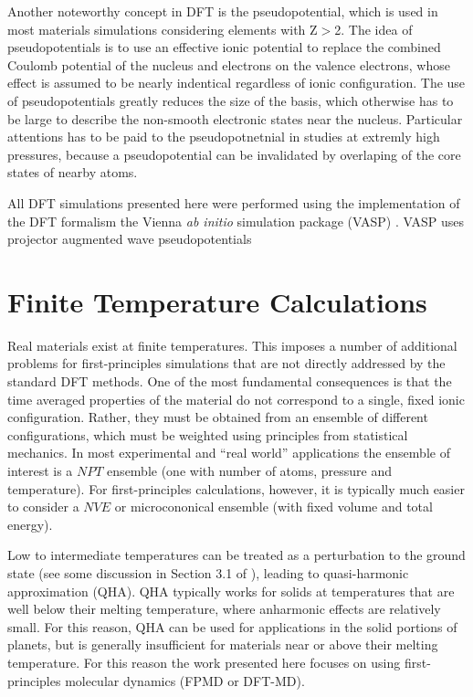 Another noteworthy concept in DFT is the pseudopotential, which is  used in most
materials simulations considering elements with Z$>$2. The idea of pseudopotentials
is to use an effective ionic potential to replace the combined Coulomb potential of
the nucleus and electrons on the valence electrons, whose effect is assumed to be
nearly indentical regardless of ionic configuration. The use of pseudopotentials
greatly reduces the size of the basis, which otherwise has to be large to describe
the non-smooth electronic states near the nucleus. Particular attentions has to be
paid to the pseudopotnetnial in studies at extremly high pressures, because a
pseudopotential can be invalidated by overlaping of the core states of nearby atoms.


All DFT simulations presented here were performed using the implementation of the DFT
formalism the Vienna {\it ab initio} simulation package (VASP) \citep{Kresse1996}.
VASP uses projector augmented wave pseudopotentials \citep{Blochl1994} 

\section{Finite Temperature Calculations}

Real materials exist at finite temperatures. This imposes a number of additional
problems for first-principles simulations that are not directly addressed by the 
standard DFT methods. One of the most fundamental consequences is that the time
averaged properties of the material do not correspond to a single, fixed ionic
configuration. Rather, they must be obtained from an ensemble of different
configurations, which must be weighted using principles from statistical mechanics.
In most experimental and ``real world'' applications the ensemble of interest is a
$NPT$ ensemble (one with number of atoms, pressure and temperature). For
first-principles calculations, however, it is typically much easier to consider a
$NVE$ or microcononical ensemble (with fixed volume and total energy).

Low to intermediate temperatures can be treated as a perturbation to the ground state
(see some discussion in Section 3.1 of \cite{martin-esbook}), leading to
quasi-harmonic approximation (QHA). QHA typically works for solids at temperatures
that are well below their melting temperature, where anharmonic effects are relatively
small. For this reason, QHA can be used for applications in the solid portions of
planets, but is generally insufficient for materials near or above their melting
temperature. For this reason the work presented here focuses on using
first-principles molecular dynamics (FPMD or DFT-MD).

